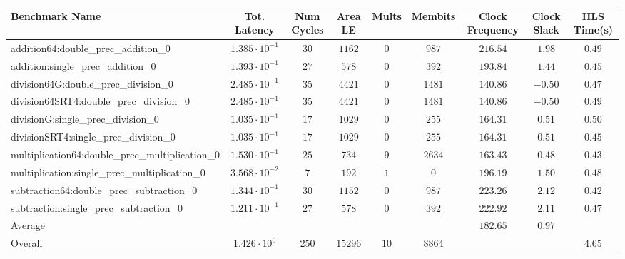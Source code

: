 \begin{tabular}{|l|c|c|c|c|c|c|c|c|}
\hline
Benchmark Name                                   & Tot. Latency            & Num Cycles & Area LE   & Mults  & Membits  & Clock Frequency & Clock Slack & HLS Time(s) \\
\hline
addition64:double\_prec\_addition\_0             & $ 1.385 \cdot 10^{-1} $ & $ 30     $ & $ 1162  $ & $ 0  $ & $ 987  $ & $ 216.54      $ & $ 1.98    $ & $ 0.49    $ \\
addition:single\_prec\_addition\_0               & $ 1.393 \cdot 10^{-1} $ & $ 27     $ & $ 578   $ & $ 0  $ & $ 392  $ & $ 193.84      $ & $ 1.44    $ & $ 0.45    $ \\
division64G:double\_prec\_division\_0            & $ 2.485 \cdot 10^{-1} $ & $ 35     $ & $ 4421  $ & $ 0  $ & $ 1481 $ & $ 140.86      $ & $ -0.50   $ & $ 0.47    $ \\
division64SRT4:double\_prec\_division\_0         & $ 2.485 \cdot 10^{-1} $ & $ 35     $ & $ 4421  $ & $ 0  $ & $ 1481 $ & $ 140.86      $ & $ -0.50   $ & $ 0.49    $ \\
divisionG:single\_prec\_division\_0              & $ 1.035 \cdot 10^{-1} $ & $ 17     $ & $ 1029  $ & $ 0  $ & $ 255  $ & $ 164.31      $ & $ 0.51    $ & $ 0.50    $ \\
divisionSRT4:single\_prec\_division\_0           & $ 1.035 \cdot 10^{-1} $ & $ 17     $ & $ 1029  $ & $ 0  $ & $ 255  $ & $ 164.31      $ & $ 0.51    $ & $ 0.45    $ \\
multiplication64:double\_prec\_multiplication\_0 & $ 1.530 \cdot 10^{-1} $ & $ 25     $ & $ 734   $ & $ 9  $ & $ 2634 $ & $ 163.43      $ & $ 0.48    $ & $ 0.43    $ \\
multiplication:single\_prec\_multiplication\_0   & $ 3.568 \cdot 10^{-2} $ & $ 7      $ & $ 192   $ & $ 1  $ & $ 0    $ & $ 196.19      $ & $ 1.50    $ & $ 0.48    $ \\
subtraction64:double\_prec\_subtraction\_0       & $ 1.344 \cdot 10^{-1} $ & $ 30     $ & $ 1152  $ & $ 0  $ & $ 987  $ & $ 223.26      $ & $ 2.12    $ & $ 0.42    $ \\
subtraction:single\_prec\_subtraction\_0         & $ 1.211 \cdot 10^{-1} $ & $ 27     $ & $ 578   $ & $ 0  $ & $ 392  $ & $ 222.92      $ & $ 2.11    $ & $ 0.47    $ \\
\hline
Average                                          & $                     $ & $        $ & $       $ & $    $ & $      $ & $ 182.65      $ & $ 0.97    $ & $         $ \\
\hline
Overall                                          & $ 1.426 \cdot 10^{0}  $ & $ 250    $ & $ 15296 $ & $ 10 $ & $ 8864 $ & $             $ & $         $ & $ 4.65    $ \\
\hline
\end{tabular}
